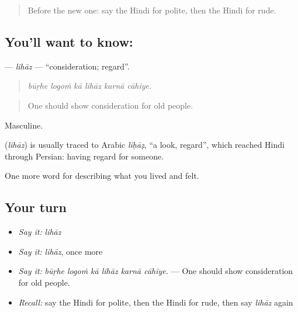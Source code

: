 \begin{quote}
Before the new one: say the Hindi for polite, then the Hindi for rude.
\end{quote}

\subsection*{You'll want to know: }
\textbf{} — \emph{lihāz} — \textquotedblleft{}consideration; regard\textquotedblright{}.

\begin{quote}
     
\end{quote}

\begin{quote}
\emph{būṛhe logoṁ kā lihāz karnā cāhiye.}
\end{quote}

\begin{quote}
One should show consideration for old people.
\end{quote}

Masculine.

\begin{cousinweb}
\textbf{} (\emph{lihāz}) is usually traced to Arabic \emph{liḥāẓ}, \textquotedblleft{}a look, regard\textquotedblright{}, which reached Hindi through Persian: having regard for someone.
\end{cousinweb}

\begin{grammarlens}[title={What you've built}]
One more word for describing what you lived and felt.
\end{grammarlens}

\subsection*{Your turn}
\begin{itemize}
\raggedright
  \item \emph{Say it:} \emph{lihāz}
  \item \emph{Say it:} \emph{lihāz}, once more
  \item \emph{Say it:} \emph{būṛhe logoṁ kā lihāz karnā cāhiye.} — One should show consideration for old people.
  \item \emph{Recall:} say the Hindi for polite, then the Hindi for rude, then say \emph{lihāz} again
\end{itemize}

